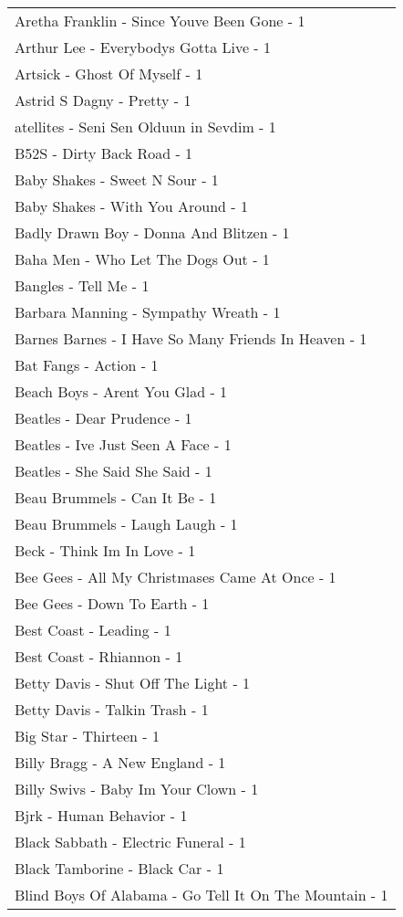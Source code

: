 \documentclass[
]{article}
\begin{document}
\begin{longtable}{l}
Aretha Franklin - Since Youve Been Gone - 1 \\ 
Arthur Lee - Everybodys Gotta Live - 1 \\ 
Artsick - Ghost Of Myself - 1 \\ 
Astrid S Dagny - Pretty - 1 \\ 
atellites - Seni Sen Olduun in Sevdim - 1 \\ 
B52S - Dirty Back Road - 1 \\ 
Baby Shakes - Sweet N Sour - 1 \\ 
Baby Shakes - With You Around - 1 \\ 
Badly Drawn Boy - Donna And Blitzen - 1 \\ 
Baha Men - Who Let The Dogs Out - 1 \\ 
Bangles - Tell Me - 1 \\ 
Barbara Manning - Sympathy Wreath - 1 \\ 
Barnes Barnes - I Have So Many Friends In Heaven - 1 \\ 
Bat Fangs - Action - 1 \\ 
Beach Boys - Arent You Glad - 1 \\ 
Beatles - Dear Prudence - 1 \\ 
Beatles - Ive Just Seen A Face - 1 \\ 
Beatles - She Said She Said - 1 \\ 
Beau Brummels - Can It Be - 1 \\ 
Beau Brummels - Laugh Laugh - 1 \\ 
Beck - Think Im In Love - 1 \\ 
Bee Gees - All My Christmases Came At Once - 1 \\ 
Bee Gees - Down To Earth - 1 \\ 
Best Coast - Leading - 1 \\ 
Best Coast - Rhiannon - 1 \\ 
Betty Davis - Shut Off The Light - 1 \\ 
Betty Davis - Talkin Trash - 1 \\ 
Big Star - Thirteen - 1 \\ 
Billy Bragg - A New England - 1 \\ 
Billy Swivs - Baby Im Your Clown - 1 \\ 
Bjrk - Human Behavior - 1 \\ 
Black Sabbath - Electric Funeral - 1 \\ 
Black Tamborine - Black Car - 1 \\ 
Blind Boys Of Alabama - Go Tell It On The Mountain - 1 \\ 

\end{longtable}
\end{document}
